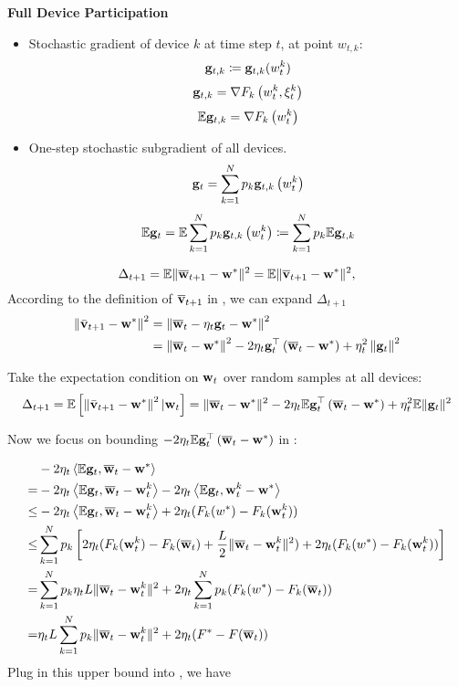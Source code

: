 

\textbf{Full Device Participation}

\begin{itemize}
	\item Stochastic gradient of device $k$ at time step $t$, at point $w_{t,k}$: 
	$${\mathbf{g}}_{t,k} \coloneqq {\mathbf{g}}_{t,k}(w_t^k)$$
	$$ {\mathbf{g}}_{t, k} = {\nabla} F_{k}\left(w_{t}^{k}, \xi_{t}^{k}\right) $$
	$$\mathbb{E} {\mathbf{g}}_{t, k} = {\nabla} F_{k}\left(w_{t}^{k}\right)$$
\item  One-step stochastic subgradient of all devices.
$${\mathbf{g}}_{t}=\sum_{k=1}^{N} p_{k} {\mathbf{g}}_{t, k}\left(w_{t}^{k}\right) $$
\begin{align}
	\mathbb{E} {\mathbf{g}}_{t}= \mathbb{E} \sum_{k=1}^{N} p_{k} {\mathbf{g}}_{t, k}\left(w_{t}^{k}\right) \coloneqq \sum_{k=1}^{N} p_{k} \mathbb{E} {\mathbf{g}}_{t, k}
	\label{eq:egtsgd}
\end{align}
\end{itemize}



$$\Delta_{t+1} = \mathbb{E} \|\overline{{\mathbf{w}}}_{t+1} - {\mathbf{w}}^*\|^2 = \mathbb{E} \|\overline{{\mathbf{v}}}_{t+1} - {\mathbf{w}}^*\|^2,$$
According to the definition of $\overline{{\mathbf{v}}}_{t+1}$ in \eq{\ref{eq:vbar}}, we can expand $\Delta_{t+1}$
$$\begin{aligned}\left\|\bar{{\mathbf{v}}}_{t+1}-{\mathbf{w}}^{*}\right\|^2 &=\left\|{\overline{\mathbf{w}}}_{t}-\eta_{t} {\mathbf{g}}_{t}-{\mathbf{w}}^{*}\right\|^2 \\ &=\left\|{\overline{\mathbf{w}}}_{t}-{\mathbf{w}}^{*}\right\|^{2}-2 \eta_{t} {\mathbf{g}}_{t}^{\top}\left({\overline{\mathbf{w}}}_{t}-{\mathbf{w}}^{*}\right)+\eta_{t}^{2}\left\|{\mathbf{g}}_{t}\right\|^{2} \end{aligned}$$

Take the expectation condition on ${\mathbf{w}}_t$ over random samples at all devices:
\begin{align}
\Delta_{t+1} = \mathbb{E}\left[\left\|\bar{{\mathbf{v}}}_{t+1}-{\mathbf{w}}^{*}\right\|^2| {\mathbf{w}}_{t}\right]=\|{\overline{\mathbf{w}}}_{t}-{\mathbf{w}}^{*}\|^{2}-2 \eta_{t} \mathbb{E} {\mathbf{g}}_{t}^{\top}\left({\overline{\mathbf{w}}}_{t}-{\mathbf{w}}^{*}\right)+\eta_{t}^{2} \mathbb{E}\| {\mathbf{g}}_{t} \|^{2}	
\label{eq:expandsgd}
\end{align}

Now we focus on bounding $-2 \eta_{t} \mathbb{E} {\mathbf{g}}_{t}^{\top}\left({\overline{\mathbf{w}}}_{t}-{\mathbf{w}}^{*}\right)$ in \eq{\ref{eq:expandsgd}}: 

\begin{align*}
	& -2 \eta_{t} \left<\mathbb{E} {\mathbf{g}}_{t}, {\overline{\mathbf{w}}}_{t}-{\mathbf{w}}^{*}\right> \\
 =  & -2 \eta_{t} \left<\mathbb{E} {\mathbf{g}}_{t}, {\overline{\mathbf{w}}}_{t}- {\mathbf{w}}^{k}_t \right> -2 \eta_{t} \left<\mathbb{E} {\mathbf{g}}_{t}, {\mathbf{w}}^{k}_t - {\mathbf{w}}^{*}\right>\\
 \leq & -2 \eta_{t} \left<\mathbb{E} {\mathbf{g}}_{t}, {\overline{\mathbf{w}}}_{t}- {\mathbf{w}}^{k}_t \right> + 2 \eta_{t} (F_k(w^*) - F_k({\mathbf{w}}^{k}_t))\\
 \leq &\sum_{k=1}^N p_k \left[2 \eta_{t} (F_k({\mathbf{w}}^{k}_t) - F_k({\overline{\mathbf{w}}}_t) + \frac{L}{2} \|{\overline{\mathbf{w}}}_t - {\mathbf{w}}^{k}_t\|^2 ) + 2 \eta_{t} (F_k(w^*) - F_k({\mathbf{w}}^{k}_t))\right]\\
 = & \sum_{k=1}^N p_k \eta_t L \|{\overline{\mathbf{w}}}_t - {\mathbf{w}}^{k}_t\|^2 + 2 \eta_{t} \sum_{k=1}^N p_k (F_k(w^*) - F_k({\overline{\mathbf{w}}}_t))\\
 = &  \eta_t L \sum_{k=1}^N p_k \|{\overline{\mathbf{w}}}_t - {\mathbf{w}}^{k}_t\|^2 + 2 \eta_{t} (F^* - F({\overline{\mathbf{w}}}_t))
\end{align*}
Plug in this upper bound into \eq{\ref{eq:expandsgd}}, we have

